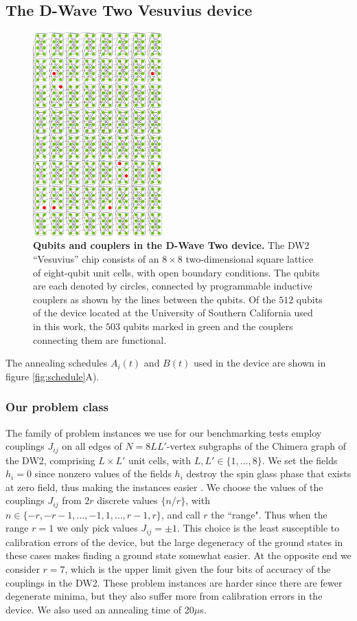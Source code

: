 \subsection{The D-Wave Two Vesuvius device}
%
%
\begin{figure}[h]
\centering
\includegraphics[width=0.443\textwidth]{chapters/Speedup/fig08.pdf}
\caption{\textbf{Qubits and couplers in the D-Wave Two device.} The DW2 ``Vesuvius'' chip consists of an $8\times8$ two-dimensional square lattice of eight-qubit unit cells, with open boundary conditions. The qubits are each denoted by circles, connected by programmable inductive couplers as shown by the lines between the qubits. Of the $512$ qubits of the device located at the University of Southern California used in this work, the $503$ qubits marked in green and the couplers connecting them are functional.}
\label{fig:chimeraDW2}
\end{figure}
%

The annealing schedules $A_i(t)$ and $B(t)$ used in the device are shown in figure \ref{fig:schedule}A).

\subsubsection{Our problem class}
The family of problem instances we use for our benchmarking tests employ couplings $J_{ij}$ on all edges of $N=8LL'$-vertex subgraphs of the Chimera graph of the DW2, comprising $L\times L'$ unit cells, with $L,L'\in\{1,\dots,8\}$. We set the fields $h_i=0$ since nonzero values of the fields $h_i$ destroy the spin glass phase that exists at zero field, thus making the instances easier \cite{AT}. We choose the values of the couplings $J_{ij}$ from $2r$ discrete values  $\{n/r\}$, with $n \in \{-r, -r-1, \dots, -1, 1, \dots, r-1, r\}$, and call $r$ the ``range". Thus when the range $r=1$ we only pick values $J_{ij}=\pm 1$. This choice is the least susceptible to calibration errors of the device, but the large degeneracy of the ground states in these cases makes finding a ground state somewhat easier. At the opposite end we consider $r=7$, which is the upper limit given the four bits of accuracy of the couplings in the DW2. These problem instances are harder since there are fewer degenerate minima, but they also suffer more from calibration errors in the device. We also used an annealing time of 20$\mu$s.

